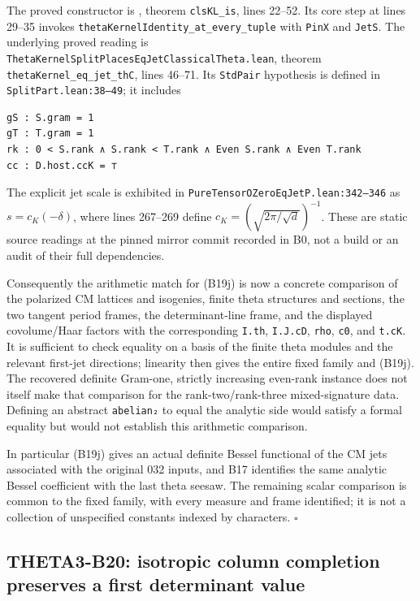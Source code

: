 \documentclass[11pt]{article}
\theoremstyle{definition}\newtheorem{definition}[theorem]{Definition}\newtheorem{remark}[theorem]{Remark}
\begin{document}
The proved constructor is
,
theorem \texttt{clsKL\_is}, lines 22--52.  Its core step at
lines 29--35 invokes
\nolinkurl{thetaKernelIdentity_at_every_tuple} with
\texttt{PinX} and \texttt{JetS}.
The underlying proved reading is
\nolinkurl{ThetaKernelSplitPlacesEqJetClassicalTheta.lean},
theorem \nolinkurl{thetaKernel_eq_jet_thC}, lines 46--71.
Its \texttt{StdPair} hypothesis is defined in
\texttt{SplitPart.lean:38--49}; it includes
\begin{verbatim}
gS : S.gram = 1
gT : T.gram = 1
rk : 0 < S.rank ∧ S.rank < T.rank ∧ Even S.rank ∧ Even T.rank
cc : D.host.ccK = ⊤
\end{verbatim}
The explicit jet scale is exhibited in
\texttt{PureTensorOZeroEqJetP.lean:342--346} as
$s=c_K(-\delta)$, where lines 267--269 define
$c_K=(\sqrt{2\pi/\sqrt d})^{-1}$.
These are static source readings at the pinned mirror commit
recorded in B0, not a build or an audit of their full dependencies.

Consequently the arithmetic match for (B19j) is now a concrete
comparison of the polarized CM lattices and isogenies, finite
theta structures and sections, the two tangent period frames,
the determinant-line frame, and the displayed covolume/Haar
factors with the corresponding \texttt{I.th}, \texttt{I.J.cD},
\texttt{rho}, \texttt{c0}, and \texttt{t.cK}.  It is sufficient
to check equality on a basis of the finite theta modules and the
relevant first-jet directions; linearity then gives the entire
fixed family and (B19j).  The recovered definite Gram-one,
strictly increasing even-rank instance does not itself make that
comparison for the rank-two/rank-three mixed-signature data.
Defining an abstract \texttt{abelian₂} to equal the analytic side
would satisfy a formal equality but would not establish this
arithmetic comparison.

In particular (B19j) gives an actual definite Bessel functional
of the CM jets associated with the original 032 inputs, and B17
identifies the same analytic Bessel coefficient with the last
theta seesaw.  The remaining scalar comparison is common to
the fixed family, with every measure and frame identified; it is
not a collection of unspecified constants indexed by characters.
\hfill$\square$


\subsection{THETA3-B20: isotropic column completion preserves a first determinant value}\label{B20}
\end{document}
